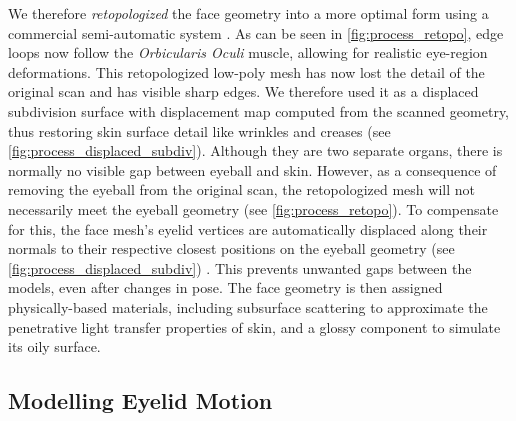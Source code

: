 We therefore \emph{retopologized} the face geometry into a more optimal form using a commercial semi-automatic system \cite{ZRemesher}.
As can be seen in \autoref{fig:process_retopo}, edge loops now follow the \emph{Orbicularis Oculi} muscle, allowing for realistic eye-region deformations.
This retopologized low-poly mesh has now lost the detail of the original scan and has visible sharp edges.
We therefore used it as a displaced subdivision surface \cite{lee2000displaced} with displacement map computed from the scanned geometry, thus restoring skin surface detail like wrinkles and creases (see \autoref{fig:process_displaced_subdiv}).
Although they are two separate organs, there is normally no visible gap between eyeball and skin.
However, as a consequence of removing the eyeball from the original scan, the retopologized mesh will not necessarily meet the eyeball geometry (see \autoref{fig:process_retopo}).
To compensate for this, the face mesh's eyelid vertices are automatically displaced along their normals to their respective closest positions on the eyeball geometry (see \autoref{fig:process_displaced_subdiv}) \cite{Shrinkwrap}.
This prevents unwanted gaps between the models, even after changes in pose.
The face geometry is then assigned physically-based materials, including subsurface scattering to approximate the penetrative light transfer properties of skin, and a glossy component to simulate its oily surface.


\subsection{Modelling Eyelid Motion}


